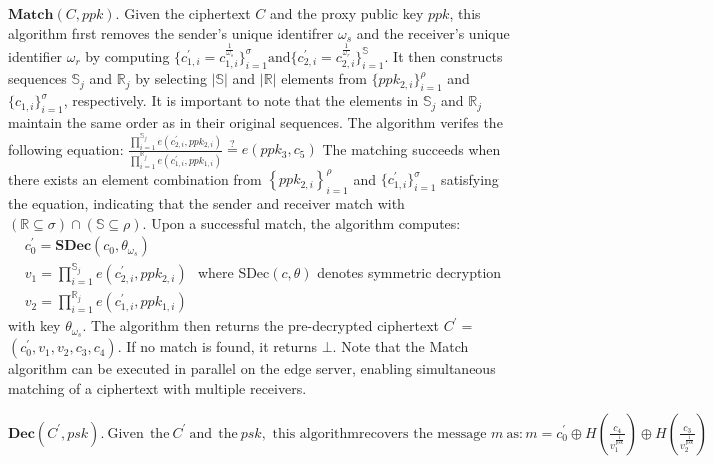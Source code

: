\documentclass[runningheads]{llncs}
\begin{document}
$\textbf{Match}( C, ppk) .$ Given the ciphertext $C$ and the proxy public key $ppk$, this algorithm fırst removes the sender's unique identifrer $\omega_s$ and the receiver's unique identifier $\omega_r$ by computing $\{c_{1,i}^{\prime}=c_{1,i}^{\frac{1}{\omega_s}}\}_{i=1}^{\sigma}\mathrm{and}\{c_{2,i}^{\prime}=c_{2,i}^{\frac{1}{\omega_r}}\}_{i=1}^{\mathbb{S}}$. It then constructs sequences $\mathbb{S}_j$ and $\mathbb{R}_j$ by selecting $|\mathbb{S}|$ and $|\mathbb{R}|$ elements from $\{ppk_{2,i}\}_{i=1}^\rho$ and $\{c_{1,i}\}_{i=1}^\sigma$, respectively. It is important to note that the elements in $\mathbb{S}_j$ and $\mathbb{R}_j$ maintain the same order as in their original sequences. The algorithm verifes the following equation:
$\frac{\prod_{i=1}^{\mathbb{S}_j}e(c_{2,i}^{\prime},ppk_{2,i})}{\prod_{i=1}^{\mathbb{R}_j}e(c_{1,i}^{\prime},ppk_{1,i})}\overset{?}{\operatorname*{\operatorname*{=}}}e(ppk_3,c_5)$
The matching succeeds when there exists an element combination from $\left\{ppk_{2,i}\right\}_{i=1}^\rho$ and $\{c_{1,i}^\prime\}_{i=1}^\sigma$ satisfying the equation, indicating that the sender and receiver match with $(\mathbb{R}\subseteq\sigma)\cap(\mathbb{S}\subseteq\rho)$. Upon a successful match, the algorithm computes:
$\begin{aligned}&c_0^{\prime}=\mathbf{SDec}(c_0,\theta_{\omega_s})\\&v_{1}=\prod_{i=1}^{\mathbb{S}_j}e(c_{2,i}^{\prime},ppk_{2,i})\\&v_{2}=\prod_{i=1}^{\mathbb{R}_j}e(c_{1,i}^{\prime},ppk_{1,i})\end{aligned}$
where SDec$( c, \theta )$ denotes symmetric decryption with key $\theta _{\omega _s}.$ The algorithm then returns the pre-decrypted ciphertext $C^\prime=$ $(c_0^{\prime},v_1,v_2,c_3,c_4).$ If no match is found, it returns $\bot.$ Note that the Match algorithm can be executed in parallel on the edge server, enabling simultaneous matching of a ciphertext with multiple receivers.

$\mathbf{Dec}(C^{\prime},psk).\mathrm{~Given~}\mathrm{~the~}C^{\prime}\mathrm{~and~}\mathrm{~the~}psk,\text{ this algorithm}\text{recovers the message }m\mathrm{~as:}m=c_0^{\prime}\oplus H\left(\frac{c_4}{v_1^{\frac{1}{psk}}}\right)\oplus H\left(\frac{c_3}{v_2^{\frac{1}{psk}}}\right)$
\end{document}
